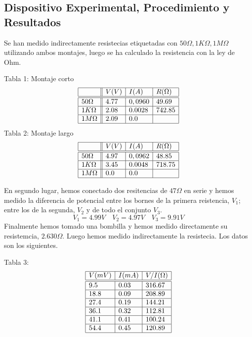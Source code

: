 \documentclass{article}
\begin{document}
\begin{multicols}{2}
\section*{Dispositivo Experimental, Procedimiento y Resultados}
Se han medido indirectamente resistecias etiquetadas con $50\Omega, 1K\Omega, 1M\Omega$ utilizando ambos montajes, luego se ha calculado la resistencia con la ley de Ohm.
\begin{center}
  Tabla 1: Montaje corto
  $$
  \begin{array}{|l||l|l|l|}\hline
    & V(V) & I(A) & R(\Omega) \\ \hline \hline
  50 \Omega & 4.77 & 0,0960 & 49.69 \\ \hline
  1K \Omega & 2.08 & 0.0028 & 742.85 \\ \hline
  1M \Omega & 2.09 & 0.0 & \\ \hline
  \end{array}
  $$
  Tabla 2: Montaje largo
  $$
  \begin{array}{|l||l|l|l|}\hline
    & V(V) & I(A) & R(\Omega) \\ \hline \hline
  50 \Omega & 4.97 & 0,0962 & 48.85 \\ \hline
  1K \Omega & 3.45 & 0.0048  & 718.75\\ \hline
  1M \Omega & 0.0 & 0.0  & \\ \hline
  \end{array}
  $$
\end{center}
En segundo lugar, hemos conectado dos resitencias de $47\Omega$ en serie y hemos medido la diferencia de potencial entre los bornes de la primera reistencia, $V_1$; entre los de la segunda, $V_2$ y de todo el conjunto $V_3$.
$$
V_1 = 4.99 V \quad V_2 = 4.97 V \quad V_3 = 9.91 V
$$
Finalmente hemos tomado una bombilla y hemos medido directamente su resistemcia, $2.630 \Omega$. Luego hemos medido indirectamente la resistecia. Los datos son los siguientes.
\begin{center}
  Tabla 3:
  $$
  \begin{array}{|l|l|l|} \hline
    V(mV) & I(mA) & V/I(\Omega) \\ \hline \hline
    9.5 & 0.03 & 316.67  \\ \hline
    18.8 & 0.09 & 208.89  \\ \hline
    27.4 & 0.19 & 144.21  \\ \hline
    36.1 & 0.32 & 112.81  \\ \hline
    41.1 & 0.41 & 100.24  \\ \hline
    54.4 & 0.45 & 120.89  \\ \hline

\end{array}$$
\end{center}
\end{multicols}
\end{document}
